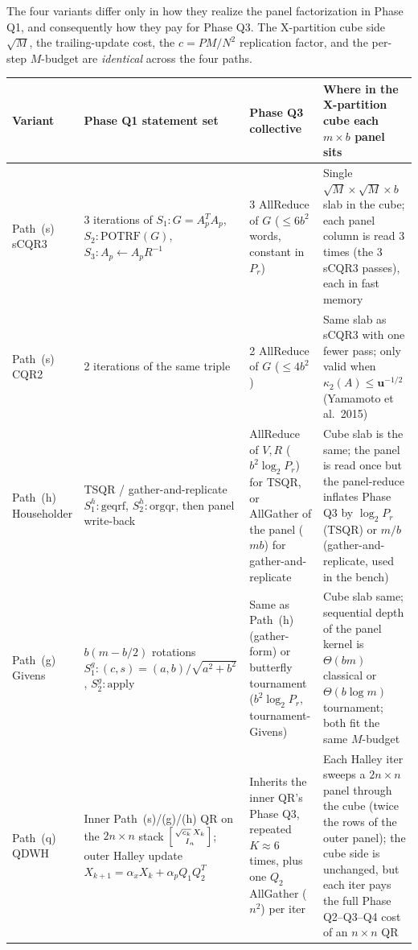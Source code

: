 \documentclass[11pt]{article}
\begin{document}
The four variants differ only in how they realize the panel
factorization in Phase Q1, and consequently how they pay for Phase Q3.
The X-partition cube side $\sqrt{M}$, the trailing-update cost, the
$c = P M / N^2$ replication factor, and the per-step $M$-budget are
\emph{identical} across the four paths.

\begin{center}
\renewcommand{\arraystretch}{1.15}
\begin{tabular}{l p{} p{} p{}}
\toprule
Variant
  & Phase Q1 statement set
  & Phase Q3 collective
  & Where in the X-partition cube each $m{\times}b$ panel sits \\
\midrule
Path~(s) sCQR3
  & 3 iterations of  $S_1{:}G\!=\!A_p^T A_p$,  $S_2{:}\mathrm{POTRF}(G)$,  $S_3{:}A_p\!\leftarrow\!A_p R^{-1}$
  & 3 AllReduce of $G$ ($\le 6 b^2$ words, constant in $P_r$)
  & Single $\sqrt{M}\times\sqrt{M}\times b$ slab in the cube; each
    panel column is read 3 times (the 3 sCQR3 passes), each in fast
    memory \\
Path~(s) CQR2
  & 2 iterations of the same triple
  & 2 AllReduce of $G$ ($\le 4 b^2$)
  & Same slab as sCQR3 with one fewer pass; only valid when
    $\kappa_2(A) \le \mathbf{u}^{-1/2}$ (Yamamoto et al.\ 2015) \\
Path~(h) Householder
  & TSQR / gather-and-replicate
    $S_1^h{:}\mathrm{geqrf}$,
    $S_2^h{:}\mathrm{orgqr}$, then panel write-back
  & AllReduce of $V, R$ ($b^2 \log_2 P_r$) for TSQR, or AllGather
    of the panel ($m b$) for gather-and-replicate
  & Cube slab is the same; the panel is read once but the panel-reduce
    inflates Phase Q3 by $\log_2 P_r$ (TSQR) or $m/b$
    (gather-and-replicate, used in the bench) \\
Path~(g) Givens
  & $b (m - b/2)$ rotations
    $S_1^g{:}(c, s) = (a, b)/\sqrt{a^2{+}b^2}$,
    $S_2^g{:}\text{apply}$
  & Same as Path~(h) (gather-form) or
    butterfly tournament ($b^2 \log_2 P_r$, tournament-Givens)
  & Cube slab same; sequential depth of the panel kernel is
    $\Theta(b m)$ classical or $\Theta(b \log m)$ tournament; both
    fit the same $M$-budget \\
Path~(q) QDWH
  & Inner Path~(s)/(g)/(h) QR on the $2n \times n$ stack
    $\begin{bsmallmatrix}\sqrt{c_k}\,X_k\\ I_n\end{bsmallmatrix}$;
    outer Halley update $X_{k+1} = \alpha_x X_k + \alpha_p Q_1 Q_2^T$
  & Inherits the inner QR's Phase Q3, repeated $K{\approx}6$ times,
    plus one $Q_2$ AllGather ($n^2$) per iter
  & Each Halley iter sweeps a $2n\times n$ panel through the cube
    (twice the rows of the outer panel); the cube side is unchanged,
    but each iter pays the full Phase Q2--Q3--Q4 cost of an $n\times
    n$ QR \\
\bottomrule
\end{tabular}
\end{center}
\end{document}
